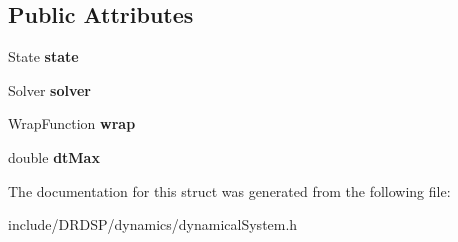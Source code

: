 \subsection*{Public Attributes}
\begin{DoxyCompactItemize}
\item 
\hypertarget{struct_d_r_d_s_p_1_1_continuous_dynamical_system_a0704c63204b6786fdc4299591f14baf9}{State {\bfseries state}}\label{struct_d_r_d_s_p_1_1_continuous_dynamical_system_a0704c63204b6786fdc4299591f14baf9}

\item 
\hypertarget{struct_d_r_d_s_p_1_1_continuous_dynamical_system_a069c1e6770595fc96296bfa8422a259c}{Solver {\bfseries solver}}\label{struct_d_r_d_s_p_1_1_continuous_dynamical_system_a069c1e6770595fc96296bfa8422a259c}

\item 
\hypertarget{struct_d_r_d_s_p_1_1_continuous_dynamical_system_a3232d59b102cd9188b9c992f12faa579}{Wrap\-Function {\bfseries wrap}}\label{struct_d_r_d_s_p_1_1_continuous_dynamical_system_a3232d59b102cd9188b9c992f12faa579}

\item 
\hypertarget{struct_d_r_d_s_p_1_1_continuous_dynamical_system_a610a818a2582ed4ccbbba905e84d0616}{double {\bfseries dt\-Max}}\label{struct_d_r_d_s_p_1_1_continuous_dynamical_system_a610a818a2582ed4ccbbba905e84d0616}

\end{DoxyCompactItemize}


The documentation for this struct was generated from the following file\-:\begin{DoxyCompactItemize}
\item 
include/\-D\-R\-D\-S\-P/dynamics/dynamical\-System.\-h\end{DoxyCompactItemize}
